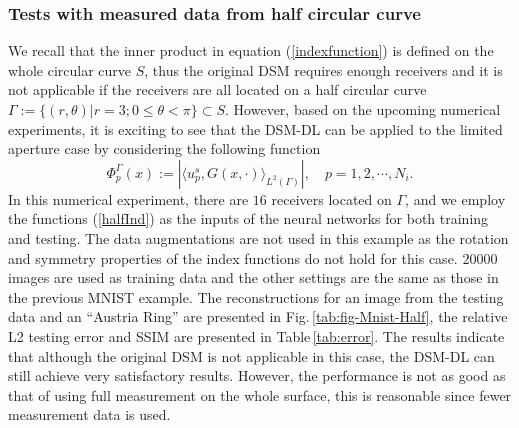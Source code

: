 \documentclass{article}
\begin{document}
	
	\subsubsection{Tests with measured data from half circular curve}
	We recall that the inner product in equation (\ref{indexfunction}) is defined on the whole circular curve $S$, thus the original DSM requires enough receivers and it is not applicable if the receivers are all located on a half circular curve $\Gamma:=\{(r,\theta)\big\vert r=3; 0\le\theta<\pi\}\subset S$. However, based on the upcoming numerical experiments, it is exciting to see that the DSM-DL can be applied to the limited aperture case by considering the following function
	\begin{equation}
		\Phi^{\Gamma}_{p}(x):=|\langle u^{s}_{p},G(x,\cdot)\rangle_{L^{2}(\Gamma)}|, \quad p=1,2,\cdots,N_{i}. 
		\label{halfInd}
	\end{equation}
	In this numerical experiment, there are $16$ receivers located on $\Gamma$, and we employ the functions (\ref{halfInd}) as the inputs of the neural networks for both training and testing. The data augmentations are not used in this example as the rotation and symmetry properties of the index functions do not hold for this case. $20000$ images are used as training data and the other settings are the same as those in the previous MNIST example. The reconstructions for an image from the testing data and an “Austria Ring” are presented in Fig.\,\ref{tab:fig-Mnist-Half}, the relative L2 testing error and SSIM are presented in Table\,\ref{tab:error}. The results indicate that although the original DSM is not applicable in this case, the DSM-DL can still achieve very satisfactory results. However, the performance is not as good as that of using full measurement on the whole surface, this is reasonable since fewer measurement data is used.
\end{document}
